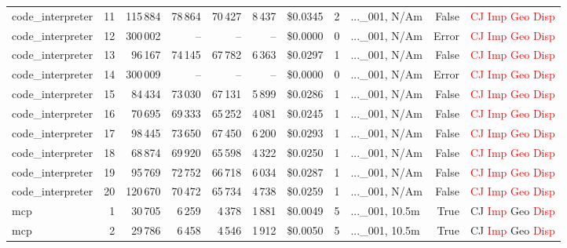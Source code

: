 \documentclass[a4paper,11pt]{article}
\begin{document}
\begin{table}[H]
{\begin{tabular}{l r r r r r r r l r l}
code\_interpreter & 11 & 115\,884 & 78\,864 & 70\,427 & 8\,437 & \$0.0345 & 2 & ...\_001, N/Am & False & \textcolor{red}{CJ} \textcolor{red}{Imp} \textcolor{red}{Geo} \textcolor{red}{Disp} \\
code\_interpreter & 12 & 300\,002 & -- & -- & -- & \$0.0000 & 0 & ...\_001, N/Am & Error & \textcolor{red}{CJ} \textcolor{red}{Imp} \textcolor{red}{Geo} \textcolor{red}{Disp} \\
code\_interpreter & 13 & 96\,167 & 74\,145 & 67\,782 & 6\,363 & \$0.0297 & 1 & ...\_001, N/Am & False & \textcolor{red}{CJ} \textcolor{red}{Imp} \textcolor{red}{Geo} \textcolor{red}{Disp} \\
code\_interpreter & 14 & 300\,009 & -- & -- & -- & \$0.0000 & 0 & ...\_001, N/Am & Error & \textcolor{red}{CJ} \textcolor{red}{Imp} \textcolor{red}{Geo} \textcolor{red}{Disp} \\
code\_interpreter & 15 & 84\,434 & 73\,030 & 67\,131 & 5\,899 & \$0.0286 & 1 & ...\_001, N/Am & False & \textcolor{red}{CJ} \textcolor{red}{Imp} \textcolor{red}{Geo} \textcolor{red}{Disp} \\
code\_interpreter & 16 & 70\,695 & 69\,333 & 65\,252 & 4\,081 & \$0.0245 & 1 & ...\_001, N/Am & False & \textcolor{red}{CJ} \textcolor{red}{Imp} \textcolor{red}{Geo} \textcolor{red}{Disp} \\
code\_interpreter & 17 & 98\,445 & 73\,650 & 67\,450 & 6\,200 & \$0.0293 & 1 & ...\_001, N/Am & False & \textcolor{red}{CJ} \textcolor{red}{Imp} \textcolor{red}{Geo} \textcolor{red}{Disp} \\
code\_interpreter & 18 & 68\,874 & 69\,920 & 65\,598 & 4\,322 & \$0.0250 & 1 & ...\_001, N/Am & False & \textcolor{red}{CJ} \textcolor{red}{Imp} \textcolor{red}{Geo} \textcolor{red}{Disp} \\
code\_interpreter & 19 & 95\,769 & 72\,752 & 66\,718 & 6\,034 & \$0.0287 & 1 & ...\_001, N/Am & False & \textcolor{red}{CJ} \textcolor{red}{Imp} \textcolor{red}{Geo} \textcolor{red}{Disp} \\
code\_interpreter & 20 & 120\,670 & 70\,472 & 65\,734 & 4\,738 & \$0.0259 & 1 & ...\_001, N/Am & False & \textcolor{red}{CJ} \textcolor{red}{Imp} \textcolor{red}{Geo} \textcolor{red}{Disp} \\
\midrule
mcp & 1 & 30\,705 & 6\,259 & 4\,378 & 1\,881 & \$0.0049 & 5 & ...\_001, 10.5m & True & CJ \textcolor{red}{Imp} Geo \textcolor{red}{Disp} \\
mcp & 2 & 29\,786 & 6\,458 & 4\,546 & 1\,912 & \$0.0050 & 5 & ...\_001, 10.5m & True & CJ \textcolor{red}{Imp} Geo \textcolor{red}{Disp} \\

\end{tabular}}
\end{table}
\end{document}
